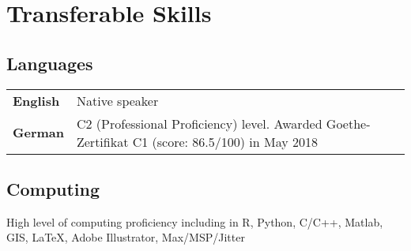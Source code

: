 \section*{Transferable Skills}

\subsection*{Languages}

\begin{center}
\begin{tabular}{ l l }
\textbf{English}  & Native speaker\\ 
\textbf{German} & C2 (Professional Proficiency) level. Awarded Goethe-Zertifikat C1 (score: 86.5/100) in May 2018\\ 
\end{tabular}
\end{center}

\subsection*{Computing}

\noindent High level of computing proficiency including in R, Python, C/C++, Matlab, GIS, \LaTeX, Adobe Illustrator, Max/MSP/Jitter




